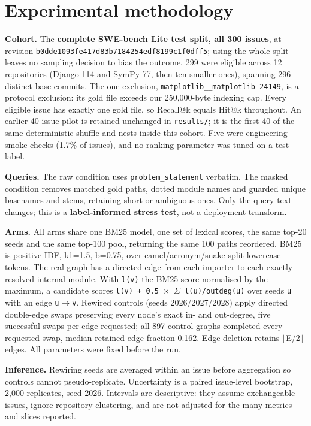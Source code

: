\documentclass[10pt,a4paper]{article}
\begin{document}
\section{Experimental methodology}
\textbf{Cohort.} The \textbf{complete SWE-bench Lite test split, all 300 issues}, at revision \texttt{b0dde1093fe417d83b\allowbreak{}7184254edf8199c1f0\allowbreak{}dff5}; using the whole split leaves no sampling decision to bias the outcome. 299 were eligible across 12 repositories (Django 114 and SymPy 77, then ten smaller ones), spanning 296 distinct base commits. The one exclusion, \texttt{matplotlib\_\_matp\allowbreak{}lotlib-24149}, is a protocol exclusion: its gold file exceeds our 250,000-byte indexing cap. Every eligible issue has exactly one gold file, so Recall@k equals Hit@k throughout. An earlier 40-issue pilot is retained unchanged in \texttt{results/}; it is the first 40 of the same deterministic shuffle and nests inside this cohort. Five were engineering smoke checks (1.7\% of issues), and no ranking parameter was tuned on a test label.

\textbf{Queries.} The raw condition uses \texttt{problem\_statement} verbatim. The masked condition removes matched gold paths, dotted module names and guarded unique basenames and stems, retaining short or ambiguous ones. Only the query text changes; this is a \textbf{label-informed stress test}, not a deployment transform.

\textbf{Arms.} All arms share one BM25 model, one set of lexical scores, the same top-20 seeds and the same top-100 pool, returning the same 100 paths reordered. BM25 is positive-IDF, k1=1.5, b=0.75, over camel/acronym/snake-split lowercase tokens. The real graph has a directed edge from each importer to each exactly resolved internal module. With \texttt{l(v)} the BM25 score normalised by the maximum, a candidate scores \texttt{l(v) + 0.5 $\times$ $\Sigma$ l(u)/outdeg(u)} over seeds \texttt{u} with an edge \texttt{u$\rightarrow$v}. Rewired controls (seeds 2026/2027/2028) apply directed double-edge swaps preserving every node's exact in- and out-degree, five successful swaps per edge requested; all 897 control graphs completed every requested swap, median retained-edge fraction 0.162. Edge deletion retains $\lfloor$E/2$\rfloor$ edges. All parameters were fixed before the run.

\textbf{Inference.} Rewiring seeds are averaged within an issue before aggregation so controls cannot pseudo-replicate. Uncertainty is a paired issue-level bootstrap, 2,000 replicates, seed 2026. Intervals are descriptive: they assume exchangeable issues, ignore repository clustering, and are not adjusted for the many metrics and slices reported.
\end{document}
